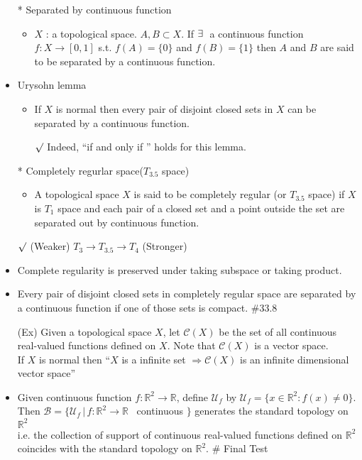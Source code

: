 \documentclass[12pt]{article}
\newcommand{\rmk}{$\surd$}
\newcommand{\spone}{\hspace{0.1cm}}
\newcommand{\Real}{\mathbb{R}}
\newcommand{\U}{\mathcal{U}}
\newcommand{\B}{\mathcal{B}}
\newcommand{\C}{\mathcal{C}}
\newcommand{\exist}{\exists\spone}
\begin{document}
\begin{itemize}
	\item[*] Separated by continuous function
	\begin{itemize}
		\item $X$ : a topological space. $A,B\subset X$. If $\exist$  a continuous function $f: X\rightarrow [0,1]$ s.t. $f(A)=\{0\}$ and $f(B)=\{1\}$ then  $A$ and $B$ are said to be separated by a continuous function.
	\end{itemize}
	\item Urysohn lemma
	\begin{itemize}
		\item If $X$ is normal then every pair of disjoint closed sets in $X$ can be separated by a continuous function.
		\item[\rmk] Indeed, ``if and only if '' holds for this lemma.
	\end{itemize}
	\item[*]Completely regurlar space($T_{3.5}$ space)
	\begin{itemize}
		\item A topological space $X$ is said to be completely regular (or $T_{3.5}$ space) if $X$ is $T_1$ space and each pair of a closed set and a point outside the set are separated out by continuous function.
	\end{itemize}
	\item[\rmk] (Weaker)\; $T_3\rightarrow T_{3.5}\rightarrow T_4$\; (Stronger) 
	\item Complete regularity is preserved under taking subspace or taking product.
	\item Every pair of disjoint closed sets in completely regular space are separated by a continuous function if one of those sets is compact. \quad \#33.8
	\item[(Ex)] Given a topological space $X$, let $\C(X)$ be the set of all continuous real-valued functions defined on $X$. Note that $\C(X)$ is a vector space.\\ If $X$ is normal then ``$X$ is a infinite set $\Rightarrow \C(X)$ is an infinite dimensional vector space''
	\item Given continuous function $f: \Real^2 \rightarrow \Real$, define $\U_f$ by $\U_f=\{x\in \Real^2 : f(x)\neq 0\}$. Then $\B=\{\U_f\, |\, f:\Real^2\rightarrow \Real$ \, continuous $\}$ generates the standard topology on $\Real^2$ \\i.e. the collection of support of continuous real-valued functions defined on $\Real^2$ coincides with the standard topology on $\Real^2$. \quad \# Final Test

\end{itemize}
\end{document}

